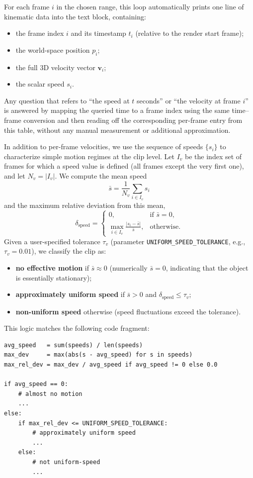 For each frame \(i\) in the chosen range, this loop automatically prints one line of kinematic data into the text block, containing:
\begin{itemize}
  \item the frame index \(i\) and its timestamp \(t_i\) (relative to the render start frame);
  \item the world-space position \(p_i\);
  \item the full 3D velocity vector \(\mathbf{v}_i\);
  \item the scalar speed \(s_i\).
\end{itemize}
Any question that refers to “the speed at \(t\) seconds” or “the velocity at frame \(i\)” is answered by mapping the queried time to a frame index using the same time--frame conversion and then reading off the corresponding per-frame entry from this table, without any manual measurement or additional approximation.

In addition to per-frame velocities, we use the sequence of speeds \(\{s_i\}\) to characterize simple motion regimes at the clip level. Let \(I_v\) be the index set of frames for which a speed value is defined (all frames except the very first one), and let \(N_v = |I_v|\). We compute the mean speed
\[
\bar{s} = \frac{1}{N_v} \sum_{i \in I_v} s_i
\]
and the maximum relative deviation from this mean,
\[
\delta_{\text{speed}} =
\begin{cases}
0, & \text{if } \bar{s} = 0, \\[4pt]
\displaystyle \max_{i \in I_v} \frac{|s_i - \bar{s}|}{\bar{s}}, & \text{otherwise.}
\end{cases}
\]
Given a user-specified tolerance \(\tau_v\) (parameter \texttt{UNIFORM\_SPEED\_TOLERANCE}, e.g., \(\tau_v = 0.01\)), we classify the clip as:
\begin{itemize}
  \item \textbf{no effective motion} if \(\bar{s} \approx 0\) (numerically \(\bar{s} = 0\), indicating that the object is essentially stationary);
  \item \textbf{approximately uniform speed} if \(\bar{s} > 0\) and \(\delta_{\text{speed}} \le \tau_v\);
  \item \textbf{non-uniform speed} otherwise (speed fluctuations exceed the tolerance).
\end{itemize}
This logic matches the following code fragment:
\begin{verbatim}
avg_speed   = sum(speeds) / len(speeds)
max_dev     = max(abs(s - avg_speed) for s in speeds)
max_rel_dev = max_dev / avg_speed if avg_speed != 0 else 0.0

if avg_speed == 0:
    # almost no motion
    ...
else:
    if max_rel_dev <= UNIFORM_SPEED_TOLERANCE:
        # approximately uniform speed
        ...
    else:
        # not uniform-speed
        ...
\end{verbatim}

